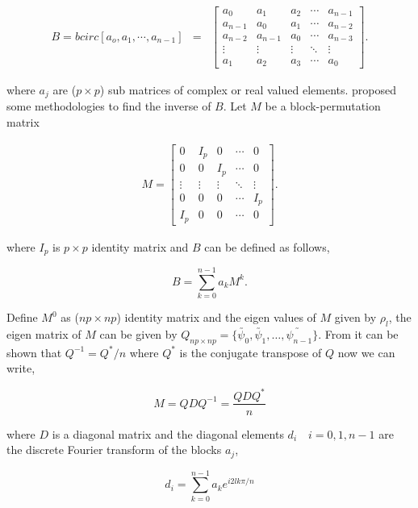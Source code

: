\begin{eqnarray}
	B = bcirc[a_o, a_1,\cdots,a_{n-1}] &=& \left[
		\begin{array}{lllll}
			a_0     & a_1     & a_2    & \cdots & a_{n-1} \\
			a_{n-1} & a_0     & a_1    & \cdots & a_{n-2} \\
			a_{n-2} & a_{n-1} & a_0    & \cdots & a_{n-3} \\
			\vdots  & \vdots  & \vdots & \ddots & \vdots  \\
			a_1     & a_2     & a_3    & \cdots & a_0     
		\end{array}
	\right].
\end{eqnarray}

where $a_j$ are ($p \times p$) sub matrices of complex or real valued elements. \cite{DeMazancourt1983} proposed some methodologies to find the inverse of $B$. Let $M$ be a block-permutation matrix

\begin{eqnarray*}
	M = \left[
		\begin{array}{lllll}
			0       & I_p     & 0      & \cdots & 0 \\
			0       & 0       & I_p    & \cdots & 0 \\
			\vdots  & \vdots  & \vdots & \ddots & \vdots  \\
			0       & 0       & 0      & \cdots & I_p \\
			I_p     & 0     & 0    & \cdots & 0     
		\end{array}
	\right].
\end{eqnarray*}

where $I_p$ is $p\times p$ identity matrix and $B$ can be defined as follows,

\[ 
B = \sum_{k=0}^{n-1} a_k M^k.
\]

Define $M^0$ as ($np\times np$) identity matrix and the eigen values of $M$ given by $\rho_l$, the eigen matrix of $M$ can be given by $Q_{np\times np}=\{ \utilde{\psi_0}, \utilde{\psi_1},\ldots, \utilde{\psi_{n-1}} \}$. From \cite{Trapp1973} it can be shown that $Q^{-1} = Q^*/n$ where $Q^*$ is the conjugate transpose of $Q$ now we can write,

\[
M = QDQ^{-1} = \frac{QDQ^*}{n}
\]

where $D$ is a diagonal matrix and the diagonal elements $d_i \quad i=0,1, n-1$ are the discrete Fourier transform of the blocks $a_j$,

\[
d_i = \sum_{k=0}^{n-1} a_k e^{i2lk\pi/n}
\]

